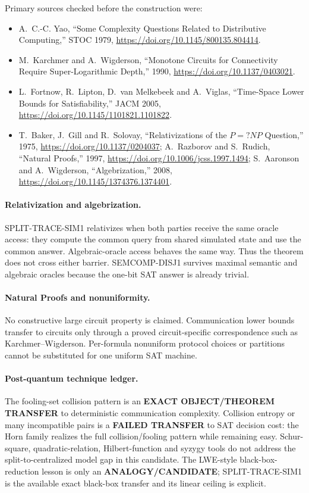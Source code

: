 \documentclass[11pt]{article}
\begin{document}
Primary sources checked before the construction were:
\begin{itemize}[leftmargin=*]
\item A.~C.-C. Yao, ``Some Complexity Questions Related to Distributive
Computing,'' STOC 1979, \url{https://doi.org/10.1145/800135.804414}.
\item M.~Karchmer and A.~Wigderson, ``Monotone Circuits for Connectivity
Require Super-Logarithmic Depth,'' 1990,
\url{https://doi.org/10.1137/0403021}.
\item L.~Fortnow, R.~Lipton, D.~van Melkebeek and A.~Viglas,
``Time-Space Lower Bounds for Satisfiability,'' JACM 2005,
\url{https://doi.org/10.1145/1101821.1101822}.
\item T.~Baker, J.~Gill and R.~Solovay, ``Relativizations of the
$P=?NP$ Question,'' 1975, \url{https://doi.org/10.1137/0204037};
A.~Razborov and S.~Rudich, ``Natural Proofs,'' 1997,
\url{https://doi.org/10.1006/jcss.1997.1494}; S.~Aaronson and
A.~Wigderson, ``Algebrization,'' 2008,
\url{https://doi.org/10.1145/1374376.1374401}.
\end{itemize}

\paragraph{Relativization and algebrization.}
SPLIT-TRACE-SIM1 relativizes when both parties receive the same oracle access:
they compute the common query from shared simulated state and use the common
answer.  Algebraic-oracle access behaves the same way.  Thus the theorem does
not cross either barrier.  SEMCOMP-DISJ1 survives maximal semantic and
algebraic oracles because the one-bit SAT answer is already trivial.

\paragraph{Natural Proofs and nonuniformity.}
No constructive large circuit property is claimed.  Communication lower
bounds transfer to circuits only through a proved circuit-specific
correspondence such as Karchmer--Wigderson.  Per-formula nonuniform protocol
choices or partitions cannot be substituted for one uniform SAT machine.

\paragraph{Post-quantum technique ledger.}
The fooling-set collision pattern is an \textbf{EXACT OBJECT/THEOREM
TRANSFER} to deterministic communication complexity.  Collision entropy or
many incompatible pairs is a \textbf{FAILED TRANSFER} to SAT decision cost:
the Horn family realizes the full collision/fooling pattern while remaining
easy.  Schur-square, quadratic-relation, Hilbert-function and syzygy tools do
not address the split-to-centralized model gap in this candidate.  The
LWE-style black-box-reduction lesson is only an \textbf{ANALOGY/CANDIDATE};
SPLIT-TRACE-SIM1 is the available exact black-box transfer and its linear
ceiling is explicit.
\end{document}
